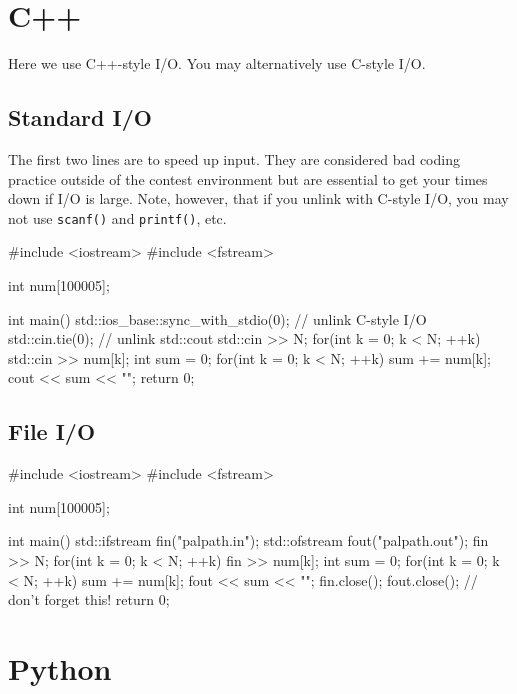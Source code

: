 \section{C++}

\lstset{language=C++}

Here we use C++-style I/O. You may alternatively use C-style I/O. 

\subsection{Standard I/O}

The first two lines are to speed up input. They are considered bad coding practice outside of the contest environment but are essential to get your times down if I/O is large. Note, however, that if you unlink with C-style I/O, you may not use \texttt{scanf()} and \texttt{printf()}, etc.

\begin{mylstlisting}
#include <iostream>
#include <fstream>

int num[100005];

int main() {
    std::ios_base::sync_with_stdio(0); // unlink C-style I/O
    std::cin.tie(0); // unlink std::cout
	std::cin >> N;
	for(int k = 0; k < N; ++k) {
		std::cin >> num[k];
	}
	int sum = 0;
	for(int k = 0; k < N; ++k) {
		sum += num[k];
	}
	cout << sum << "\n";
	return 0;
}
\end{mylstlisting}

\subsection{File I/O}

\begin{mylstlisting}
#include <iostream>
#include <fstream>

int num[100005];

int main() {
	std::ifstream fin("palpath.in");
	std::ofstream fout("palpath.out");
	fin >> N;
	for(int k = 0; k < N; ++k) {
		fin >> num[k];
	}
	int sum = 0;
	for(int k = 0; k < N; ++k) {
		sum += num[k];
	}
	fout << sum << "\n";
	fin.close();
	fout.close(); // don't forget this!
	return 0;
}
\end{mylstlisting}

\section{Python}

\lstset{language=Python}

